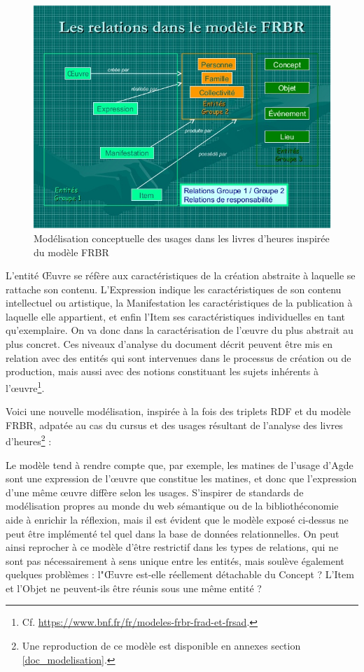 \documentclass[a4paper,12pt,twoside]{book}
\begin{document}
	\begin{figure}[!h]
    \centering
    \includegraphics[width=15cm]{img/Modelisation/Modele_type_FRBR.jpg}
    \caption{Modélisation conceptuelle des usages dans les livres d'heures inspirée du modèle FRBR}
    \end{figure}
    
    L'entité \og Œuvre\fg{} se réfère aux caractéristiques de la création abstraite à laquelle se rattache son contenu. L'\og Expression\fg{} indique les caractéristiques de son contenu intellectuel ou artistique, la \og Manifestation\fg{} les caractéristiques de la publication à laquelle elle appartient, et enfin l'\og Item\fg{} ses caractéristiques individuelles en tant qu’exemplaire. On va donc dans la caractérisation de l'œuvre du plus abstrait au plus concret. Ces niveaux d'analyse du document décrit peuvent être mis en relation avec des entités qui sont intervenues dans le processus de création ou de production, mais aussi avec des notions constituant les sujets inhérents à l'œuvre\footnote{Cf. \url{https://www.bnf.fr/fr/modeles-frbr-frad-et-frsad}.}. 
   
    Voici une nouvelle modélisation, inspirée à la fois des triplets RDF et du modèle FRBR, adpatée au cas du cursus et des usages résultant de l'analyse des livres d'heures\footnote{Une reproduction de ce modèle est disponible en annexes section \ref{doc_modelisation}.} : 
    
    
    Le modèle tend à rendre compte que, par exemple, les matines de l'usage d'Agde sont une expression de l'œuvre que constitue les matines, et donc que l'expression d'une même œuvre diffère selon les usages. S'inspirer de standards de modélisation propres au monde du web sémantique ou de la bibliothéconomie aide à enrichir la réflexion, mais il est évident que le modèle exposé ci-dessus ne peut être implémenté tel quel dans la base de données relationnelles. On peut ainsi reprocher à ce modèle d'être restrictif dans les types de relations, qui ne sont pas nécessairement à sens unique entre les entités, mais soulève également quelques problèmes : l"\og Œuvre\fg{} est-elle réellement détachable du \og Concept\fg{} ? L'\og Item\fg{} et l'\og Objet\fg{} ne peuvent-ils être réunis sous une même entité ? \\
    
\end{document}
